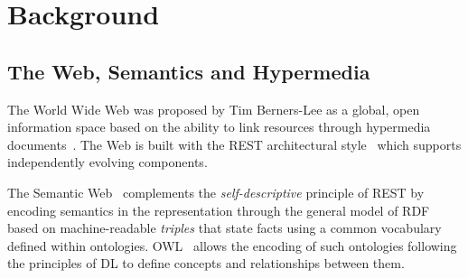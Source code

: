 \section{Background}
\label{sec:hypermas:background}

\subsection{The Web, Semantics and Hypermedia}

The World Wide Web was proposed by Tim Berners-Lee as a global, open information space
based on the ability to link resources through hypermedia documents~\cite{DBLP:journals/cn/Berners-LeeCG92}.
%
The Web is built with the \ac{REST} architectural style~\cite{DBLP:journals/toit/FieldingT02}
which supports independently evolving components.
%

The Semantic Web~\cite{BernersLee2001} complements the \emph{self-descriptive} principle of \ac{REST}
by encoding semantics in the representation through the general model of \ac{RDF}~\cite{RDF_Concepts_W3C:14}
based on machine-readable \emph{triples}
that state facts using a common vocabulary defined within ontologies.
%
{OWL}~\cite{OWL_Syntax_W3C:12} allows the encoding of such ontologies following the principles of \ac{DL} to define concepts and relationships between them.
%


